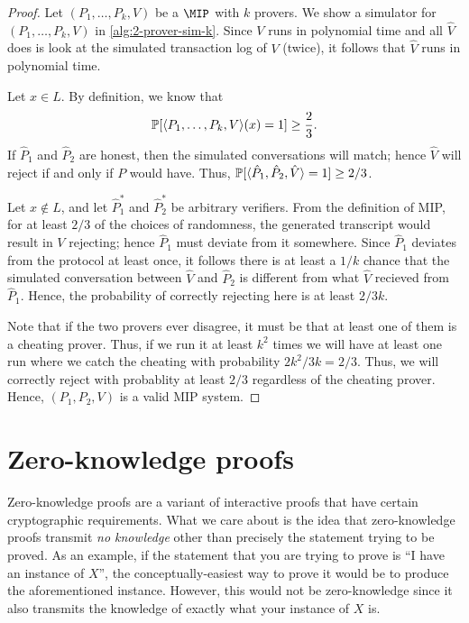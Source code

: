 \documentclass[english,12pt]{reedthesis}
\theoremstyle{plain}
\theoremstyle{definition}
\theoremstyle{remark}
\DeclarePairedDelimiter{\ang}{\langle}{\rangle}
\begin{document}
\begin{proof}
  Let $(P_{1}, \ldots, P_{k}, V)$ be a $\MIP$ with $k$ provers. We show a simulator
  for $(P_{1}, \ldots, P_{k}, V)$ in \cref{alg:2-prover-sim-k}. Since $V$ runs in
  polynomial time and all $\hat{V}$ does is look at the simulated transaction
  log of $V$ (twice), it follows that $\hat{V}$ runs in polynomial time.

  Let $x \in L$. By definition, we know that
  \begin{equation}
    \mathbb{P}[\ang{P_{1}, \ldots, P_{k}, V}(x) = 1] \ge \frac{2}{3}.
  \end{equation}
  If $\hat{P}_{1}$ and $\hat{P}_{2}$ are honest, then the simulated
  conversations will match; hence $\hat{V}$ will reject if and only if $P$ would
  have. Thus, $\mathbb{P}[\ang{\hat{P}_{1}, \hat{P}_{2}, \hat{V}} = 1] \ge 2/3$.

  Let $x \notin L$, and let $\hat{P}_{1}^{*}$ and $\hat{P}_{2}^{*}$ be arbitrary
  verifiers. From the definition of MIP, for at least $2/3$ of the choices of
  randomness, the generated transcript would result in $V$ rejecting; hence
  $\hat{P}_{1}$ must deviate from it somewhere. Since $\hat{P}_{1}$ deviates
  from the protocol at least once, it follows there is at least a $1/k$ chance
  that the simulated conversation between $\hat{V}$ and $\hat{P}_{2}$ is
  different from what $\hat{V}$ recieved from $\hat{P}_{1}$. Hence, the
  probability of correctly rejecting here is at least $2/3k$.

  Note that if the two provers ever disagree, it must be that at least one of
  them is a cheating prover. Thus, if we run it at least $k^{2}$ times we will
  have at least one run where we catch the cheating with probability
  $2k^{2}/3k = 2/3$. Thus, we will correctly reject with probablity at least
  $2/3$ regardless of the cheating prover. Hence, $(P_{1}, P_{2}, V)$ is a valid
  MIP system.
\end{proof}

\section{Zero-knowledge proofs}\label{sec:zero-knowledge}

Zero-knowledge proofs are a variant of interactive proofs that have certain
cryptographic requirements. What we care about is the idea that zero-knowledge
proofs transmit \emph{no knowledge} other than precisely the statement trying to
be proved. As an example, if the statement that you are trying to prove is ``I
have an instance of $X$'', the conceptually-easiest way to prove it would be to
produce the aforementioned instance. However, this would not be zero-knowledge
since it also transmits the knowledge of exactly what your instance of $X$ is.
\end{document}
